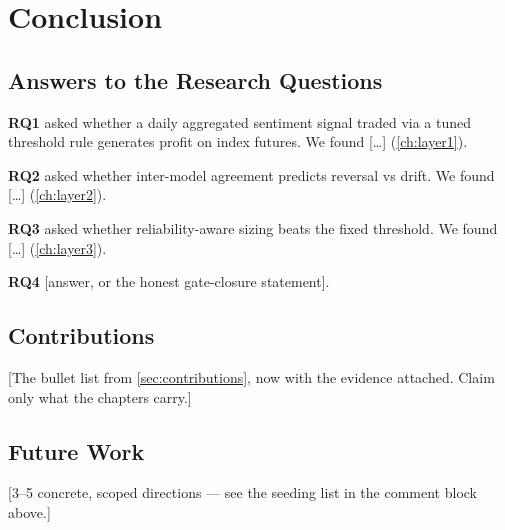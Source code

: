 %
%
%
\chapter{Conclusion}
\label{ch:conclusion}

\section{Answers to the Research Questions}
\label{sec:conc-answers}

\textbf{RQ1} asked whether a daily aggregated sentiment signal traded
via a tuned threshold rule generates profit on index futures. We found
[\dots] (\cref{ch:layer1}).

\textbf{RQ2} asked whether inter-model agreement predicts reversal vs
drift. We found [\dots] (\cref{ch:layer2}).

\textbf{RQ3} asked whether reliability-aware sizing beats the fixed
threshold. We found [\dots] (\cref{ch:layer3}).

\textbf{RQ4} [answer, or the honest gate-closure statement].

\section{Contributions}
\label{sec:conc-contributions}

[The bullet list from \cref{sec:contributions}, now with the evidence
attached. Claim only what the chapters carry.]

\section{Future Work}
\label{sec:conc-future}

[3--5 concrete, scoped directions --- see the seeding list in the
comment block above.]
